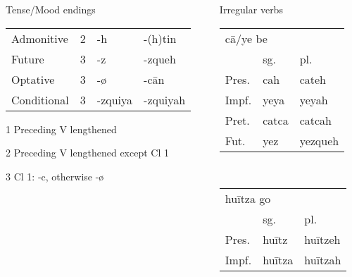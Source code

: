 \documentclass[12pt]{beamer}
\newcommand{\nah}[1]{\textcolor{nahgrn}{#1}}
\newcommand{\trs}[1]{\textcolor{nahblu}{#1}}
\begin{document}
\begin{frame}
\begin{columns}[t]
\begin{column}{.18\linewidth}
\begin{block}{Tense/Mood endings}
\begin{threeparttable}
\begin{tabular}{llll}
            Admonitive  & 2 & \nah{-h}\tnote{3}  & \nah{-(h)tin}\tnote{3} \\
            Future      & 3 & \nah{-z}           & \nah{-zqueh}           \\
            Optative    & 3 & \nah{-ø}           & \nah{-cān}             \\
            Conditional & 3 & \nah{-zquiya}      & \nah{-zquiyah}
          \end{tabular}
          \begin{tablenotes}
            \item[1] Preceding V lengthened
            \item[2] Preceding V lengthened except Cl 1
            \item[3] Cl 1: \nah{-c}, otherwise \nah{-ø}
          \end{tablenotes}
        \end{threeparttable}
      \end{block}
    \end{column}
    \begin{column}{.18\linewidth}
      \begin{block}{Irregular verbs}
        \begin{tabular}[t]{lll}
          \multicolumn{3}{l}{\nah{cā/ye} \trs{be}} \\
                & sg.         & pl.                \\
          Pres. & \nah{cah}   & \nah{cateh}        \\
          Impf. & \nah{yeya}  & \nah{yeyah}        \\
          Pret. & \nah{catca} & \nah{catcah}       \\
          Fut.  & \nah{yez}   & \nah{yezqueh}      \\
        \end{tabular}%
        \\[1ex]
        \begin{tabular}[t]{lll}
          \multicolumn{3}{l}{\nah{huītza} \trs{go}} \\
                & sg.          & pl.                \\
          Pres. & \nah{huītz}  & \nah{huītzeh}      \\
          Impf. & \nah{huītza} & \nah{huītzah}      \\
        \end{tabular}%
        \\[1ex]
        \begin{tabular}[t]{lll}

\end{tabular}
\end{block}
\end{column}
\end{columns}
\end{frame}
\end{document}
